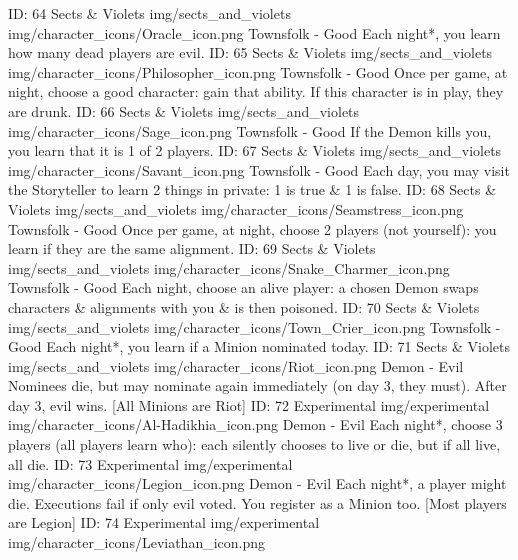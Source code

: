 	{ID: 64}
	{Sects \& Violets}
	{img/sects_and_violets}
	{img/character_icons/Oracle_icon.png}
	{\color{goodcolor}Townsfolk - Good}
	{Each night*, you learn how many dead players are evil.}        
	{ID: 65}
	{Sects \& Violets}
	{img/sects_and_violets}
	{img/character_icons/Philosopher_icon.png}
	{\color{goodcolor}Townsfolk - Good}
	{Once per game, at night, choose a good character: gain that ability. If this character is in play, they are drunk.}        
	{ID: 66}
	{Sects \& Violets}
	{img/sects_and_violets}
	{img/character_icons/Sage_icon.png}
	{\color{goodcolor}Townsfolk - Good}
	{If the Demon kills you, you learn that it is 1 of 2 players.}        
	{ID: 67}
	{Sects \& Violets}
	{img/sects_and_violets}
	{img/character_icons/Savant_icon.png}
	{\color{goodcolor}Townsfolk - Good}
	{Each day, you may visit the Storyteller to learn 2 things in private: 1 is true \& 1 is false.}        
	{ID: 68}
	{Sects \& Violets}
	{img/sects_and_violets}
	{img/character_icons/Seamstress_icon.png}
	{\color{goodcolor}Townsfolk - Good}
	{Once per game, at night, choose 2 players (not yourself): you learn if they are the same alignment.}        
	{ID: 69}
	{Sects \& Violets}
	{img/sects_and_violets}
	{img/character_icons/Snake_Charmer_icon.png}
	{\color{goodcolor}Townsfolk - Good}
	{Each night, choose an alive player: a chosen Demon swaps characters \& alignments with you \& is then poisoned.}        
	{ID: 70}
	{Sects \& Violets}
	{img/sects_and_violets}
	{img/character_icons/Town_Crier_icon.png}
	{\color{goodcolor}Townsfolk - Good}
	{Each night*, you learn if a Minion nominated today.}        
	{ID: 71}
	{Sects \& Violets}
	{img/sects_and_violets}
	{img/character_icons/Riot_icon.png}
	{\color{evilcolor}Demon - Evil}
	{Nominees die, but may nominate again immediately (on day 3, they must). After day 3, evil wins. [All Minions are Riot]}        
	{ID: 72}
	{Experimental}
	{img/experimental}
	{img/character_icons/Al-Hadikhia_icon.png}
	{\color{evilcolor}Demon - Evil}
	{Each night*, choose 3 players (all players learn who): each silently chooses to live or die, but if all live, all die.}        
	{ID: 73}
	{Experimental}
	{img/experimental}
	{img/character_icons/Legion_icon.png}
	{\color{evilcolor}Demon - Evil}
	{Each night*, a player might die. Executions fail if only evil voted. You register as a Minion too. [Most players are Legion]}        
	{ID: 74}
	{Experimental}
	{img/experimental}
	{img/character_icons/Leviathan_icon.png}
